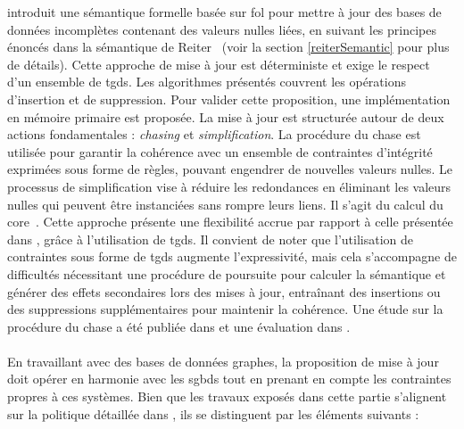 \cite{chabinConsistentUpdatingDatabases2020} introduit une sémantique formelle basée sur \gls{fol} pour mettre à jour des bases de données incomplètes contenant des valeurs nulles liées, en suivant les principes énoncés dans la sémantique de Reiter~\cite{reiterSoundSometimesComplete1986} (voir la section \ref{reiterSemantic} pour plus de détails).
Cette approche de mise à jour est déterministe et exige le respect d'un ensemble de \glspl{tgd}.
Les algorithmes présentés couvrent les opérations d'insertion et de suppression.
Pour valider cette proposition, une implémentation en mémoire primaire est proposée.
La mise à jour est structurée autour de deux actions fondamentales : \emph{chasing} et \emph{simplification}.
La procédure du \gls{chase} est utilisée pour garantir la cohérence avec un ensemble de contraintes d'intégrité exprimées sous forme de règles, pouvant engendrer de nouvelles valeurs nulles.
Le processus de simplification vise à réduire les redondances en éliminant les valeurs nulles qui peuvent être instanciées sans rompre leurs liens.
Il s'agit du calcul du \gls{core}~\cite{faginDataExchangeGetting2005}.
Cette approche présente une flexibilité accrue par rapport à celle présentée dans \cite{chabinUsingGraphGrammar2019}, grâce à l'utilisation de \glspl{tgd}.
Il convient de noter que l'utilisation de contraintes sous forme de \glspl{tgd} augmente l'expressivité, mais cela s'accompagne de difficultés nécessitant une procédure de poursuite pour calculer la sémantique et générer des effets secondaires lors des mises à jour, entraînant des insertions ou des suppressions supplémentaires pour maintenir la cohérence.
Une étude sur la procédure du \gls{chase} a été publiée dans \cite{onetChaseProcedureIts2013} et une évaluation dans \cite{benediktBenchmarkingChase2017}.

\paragraph{}
En travaillant avec des bases de données graphes, la proposition de mise à jour doit opérer en harmonie avec les \glspl{sgbd} tout en prenant en compte les contraintes propres à ces systèmes.
Bien que les travaux exposés dans cette partie s'alignent sur la politique détaillée dans \cite{chabinConsistentUpdatingDatabases2020}, ils se distinguent par les éléments suivants :

